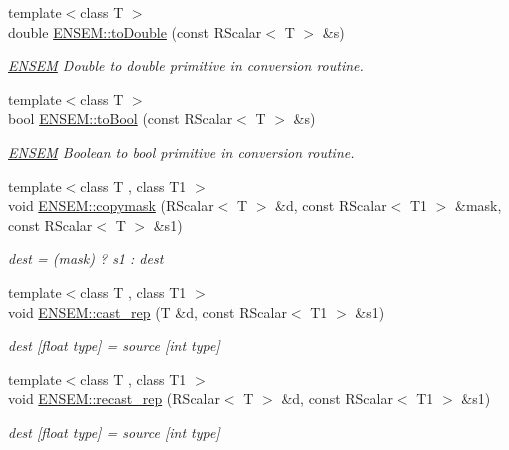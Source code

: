 \begin{DoxyCompactItemize}
{\footnotesize template$<$class T $>$ }\\double \mbox{\hyperlink{group__rscalar_gadb0411ad1a014fd37c36439881c1e2dc}{E\+N\+S\+E\+M\+::to\+Double}} (const R\+Scalar$<$ T $>$ \&s)
\begin{DoxyCompactList}\small\item\em \mbox{\hyperlink{namespaceENSEM}{E\+N\+S\+EM}} Double to double primitive in conversion routine. \end{DoxyCompactList}\item 
{\footnotesize template$<$class T $>$ }\\bool \mbox{\hyperlink{group__rscalar_ga84465303bb9b882734bb3c44dff8d024}{E\+N\+S\+E\+M\+::to\+Bool}} (const R\+Scalar$<$ T $>$ \&s)
\begin{DoxyCompactList}\small\item\em \mbox{\hyperlink{namespaceENSEM}{E\+N\+S\+EM}} Boolean to bool primitive in conversion routine. \end{DoxyCompactList}\item 
{\footnotesize template$<$class T , class T1 $>$ }\\void \mbox{\hyperlink{group__rscalar_ga2bfebcfc9a340228eb6b4449967f1fa0}{E\+N\+S\+E\+M\+::copymask}} (R\+Scalar$<$ T $>$ \&d, const R\+Scalar$<$ T1 $>$ \&mask, const R\+Scalar$<$ T $>$ \&s1)
\begin{DoxyCompactList}\small\item\em dest = (mask) ? s1 \+: dest \end{DoxyCompactList}\item 
{\footnotesize template$<$class T , class T1 $>$ }\\void \mbox{\hyperlink{group__rscalar_ga7fc2c1b07bacdd72df1204c120ace7a0}{E\+N\+S\+E\+M\+::cast\+\_\+rep}} (T \&d, const R\+Scalar$<$ T1 $>$ \&s1)
\begin{DoxyCompactList}\small\item\em dest \mbox{[}float type\mbox{]} = source \mbox{[}int type\mbox{]} \end{DoxyCompactList}\item 
{\footnotesize template$<$class T , class T1 $>$ }\\void \mbox{\hyperlink{group__rscalar_ga1ecb21d4e8fc1e664055d3fa1145f6e9}{E\+N\+S\+E\+M\+::recast\+\_\+rep}} (R\+Scalar$<$ T $>$ \&d, const R\+Scalar$<$ T1 $>$ \&s1)
\begin{DoxyCompactList}\small\item\em dest \mbox{[}float type\mbox{]} = source \mbox{[}int type\mbox{]} \end{DoxyCompactList}\item 

\end{DoxyCompactItemize}
